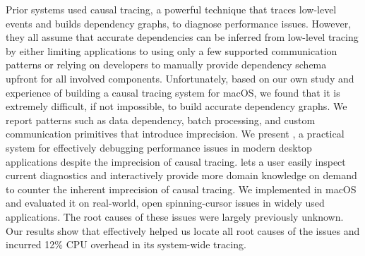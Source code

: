 Prior systems used causal tracing, a powerful technique that traces low-level
events and builds dependency graphs, to diagnose performance issues.  However,
they all assume that accurate dependencies can be inferred from low-level
tracing by either limiting applications to using only a few supported
communication patterns or relying on developers to manually provide dependency
schema upfront for all involved components.  Unfortunately, based on our own
study and experience of building a causal tracing system for macOS, we found
that it is extremely difficult, if not impossible, to build accurate dependency
graphs.  We report patterns such as data dependency, batch processing, and
custom communication primitives that introduce imprecision.  We present \xxx, a
practical system for effectively debugging performance issues in modern desktop
applications despite the imprecision of causal tracing.  \xxx lets a user
easily inspect current diagnostics and interactively provide more domain
knowledge on demand to counter the inherent imprecision of causal tracing.  We
implemented \xxx in macOS and evaluated it on \nbug real-world, open
spinning-cursor issues in widely used applications.  The root causes of these
issues were largely previously unknown.  Our results show that \xxx effectively
helped us locate all root causes of the issues and incurred 12\% CPU
overhead in its system-wide tracing.
